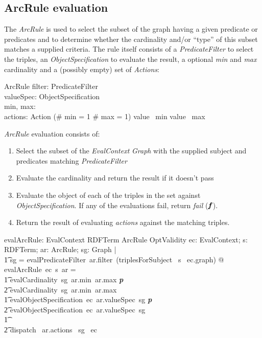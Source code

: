 \documentclass[fuzz]{llncs}
\def\pass{\textbf{\textit{p}}}
\def\fail{\textbf{\textit{f}}}
\def\zc{\textit}
\begin{document}
\subsection{ArcRule evaluation}
The \zc{ArcRule} is used to select the subset of the graph having a given predicate or
predicates and to determine whether the cardinality and/or ``type'' of this subset matches
a supplied criteria. The rule itself consists of a \zc{PredicateFilter} to select the triples,
 an \zc{ObjectSpecification} to evaluate the result, a optional \zc{min} and \zc{max}
 cardinality and a (possibly empty) set of \zc{Actions}:
\begin{schema}{ArcRule}
   filter: PredicateFilter \\
   valueSpec: ObjectSpecification \\
   min, max: \optional[\nat] \\
   actions: \power Action
\where
   (\# min = 1 \land \# max = 1) \implies value~ min \leq value~ max
\end{schema}
\zc{ArcRule} evaluation consists of:
\begin{enumerate}
\item Select the subset of the \zc{EvalContext} \zc{Graph} with the supplied subject and predicates matching  \zc{PredicateFilter}
\item Evaluate the cardinality and return the result if it doesn't pass
\item Evaluate the object of each of the triples in the set against \zc{ObjectSpecification}.  If any of the evaluations fail, return \zc{fail} ($\fail$).
\item Return the result of evaluating \zc{actions} against the matching triples.
\end{enumerate}
\begin{gendef}
   evalArcRule: EvalContext \fun RDFTerm \fun ArcRule \fun OptValidity
\where
   \forall ec: EvalContext; s: RDFTerm; ar: ArcRule; sg: Graph  | \\ 
\t1 sg = evalPredicateFilter~ar.filter~(triplesForSubject~ s~ ec.graph) @ \\
evalArcRule~ec~s~ar = \\
\t1 \IF evalCardinality~sg~ar.min~ar.max \neq \pass \\
\t2 \THEN evalCardinality~sg~ar.min~ar.max \\
\t1 \ELSE \IF evalObjectSpecification~ec~ar.valueSpec~sg \neq \pass \\
\t2 \THEN evalObjectSpecification~ec~ar.valueSpec~sg \\
\t1 \ELSE \\
\t2  dispatch~ ar.actions~ sg~ ec 
\end{gendef}
\end{document}
